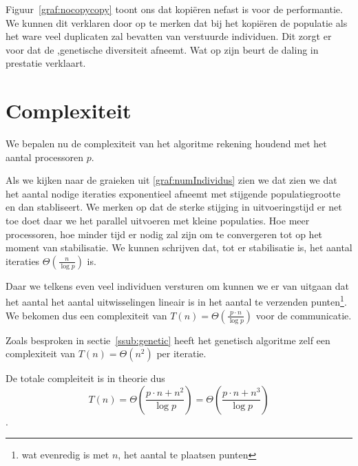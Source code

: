 Figuur~\ref{graf:nocopycopy} toont ons dat kopiëren nefast is voor de performantie.
We kunnen dit verklaren door op te merken dat bij het kopiëren de populatie als het ware veel duplicaten zal bevatten van verstuurde individuen. Dit zorgt er voor dat de ,genetische diversiteit afneemt. Wat op zijn beurt de daling in prestatie verklaart. 
\section{Complexiteit}
We bepalen nu de complexiteit van het algoritme rekening houdend met het aantal processoren $p$.


Als we kijken naar de graieken uit \ref{graf:numIndividus} zien we dat zien we dat het aantal nodige iteraties exponentieel afneemt met stijgende populatiegrootte en dan stabliseert. We merken op dat de sterke stijging in uitvoeringstijd er net toe doet daar we het parallel uitvoeren met kleine populaties. Hoe meer processoren, hoe minder tijd er nodig zal zijn om te convergeren tot op het moment van stabilisatie. We kunnen schrijven dat, tot er stabilisatie is, het aantal iteraties $\Theta\left(\frac{n}{\log{p}}\right)$ is.

Daar we telkens even veel individuen versturen om kunnen we er van uitgaan dat het aantal het aantal uitwisselingen lineair is in het aantal te verzenden punten\footnote{wat evenredig is met $n$, het aantal te plaatsen punten}. We bekomen dus een complexiteit van $T(n)=\Theta\left(\frac{p\cdot n}{\log{p}}\right)$ voor de communicatie. 


Zoals besproken in sectie~\ref{ssub:genetic} heeft het genetisch algoritme zelf een complexiteit van $T(n)=\Theta(n^2)$ per iteratie. 

De totale compleiteit is in theorie dus  \[T(n)=\Theta\left(\frac{p\cdot n + n^2}{\log{p}}\right) = \Theta\left(\frac{p\cdot n + n^3}{\log{p}}\right)\]. 

